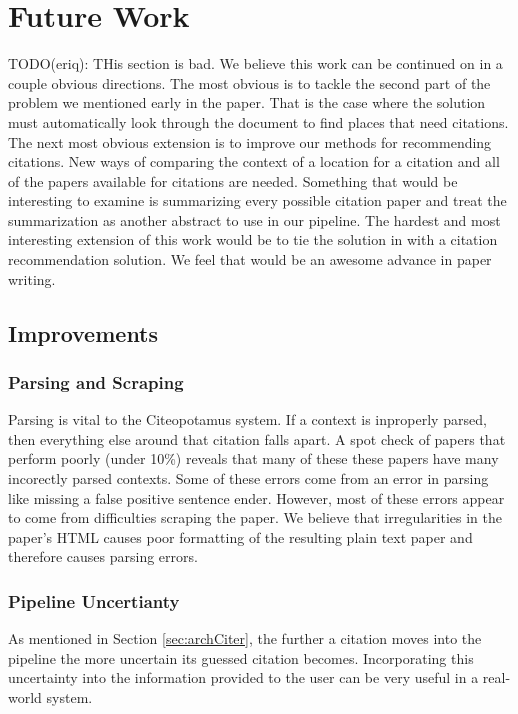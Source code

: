 \documentclass[10pt, conference, compsocconf]{IEEEtran}
\begin{document}
\section{Future Work}\label{sec:future}
TODO(eriq): THis section is bad.
We believe this work can be continued on in a couple obvious directions. The most obvious is to tackle the second part of the problem we mentioned early in the paper. That is the case where the solution must automatically look through the document to find places that need citations. The next most obvious extension is to improve our methods for recommending citations. New ways of comparing the context of a location for a citation and all of the papers available for citations are needed. Something that would be interesting to examine is summarizing every possible citation paper and treat the summarization as another abstract to use in our pipeline. The hardest and most interesting extension
of this work would be to tie the solution in with a citation recommendation solution. We feel that would be an awesome advance in paper writing.

\subsection{Improvements}

\subsubsection{Parsing and Scraping}
Parsing is vital to the Citeopotamus system. If a context is inproperly parsed, then everything else around that citation falls apart.
A spot check of papers that perform poorly (under 10\%) reveals that many of these these papers have many incorectly parsed contexts.
Some of these errors come from an error in parsing like missing a false positive sentence ender. However, most of these errors appear to
come from difficulties scraping the paper. We believe that irregularities in the paper's HTML causes poor formatting of the resulting
plain text paper and therefore causes parsing errors.

\subsubsection{Pipeline Uncertianty}
As mentioned in Section \ref{sec:archCiter}, the further a citation moves into the pipeline the more uncertain its guessed citation becomes.
Incorporating this uncertainty into the information provided to the user can be very useful in a real-world system.
\end{document}
